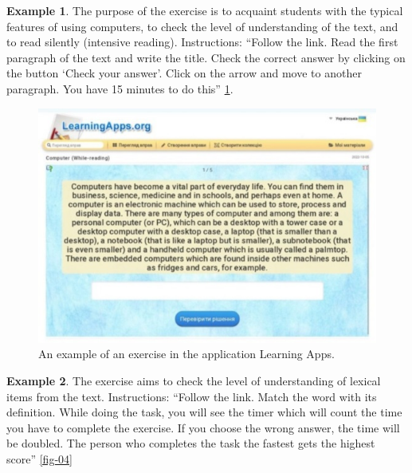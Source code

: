 \textbf{Example 1}. The purpose of the exercise is to acquaint students with the
typical features of using computers, to check the level of understanding
of the text, and to read silently (intensive reading). Instructions:
\enquote{Follow the link. Read the first paragraph of the text and write the
title. Check the correct answer by clicking on the button \enquote{Check
your answer}. Click on the arrow and move to another paragraph. You
have 15 minutes to do this} \cref{fig-03}.

\begin{figure}[htpb]
\centering
\begin{minipage}{.65\textwidth}
\caption{An example of an exercise in the application Learning Apps.}	
\label{fig-03}
\includegraphics[width=\textwidth]{figure03}
\end{minipage}
\end{figure}

\textbf{Example 2}. The exercise aims to check the level of understanding of
lexical items from the text. Instructions: \enquote{Follow the link. Match the
word with its definition. While doing the task, you will see the timer
which will count the time you have to complete the exercise. If you
choose the wrong answer, the time will be doubled. The person who
completes the task the fastest gets the highest score} \cref{fig-04}

